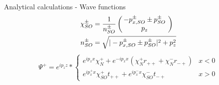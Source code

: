 \documentclass{beamer}
\newcommand{\vect}[2]{\ensuremath{\inp{\hspace{-.8ex}\begin{array}{c}#1\\#2\end{array}\hspace{-.4ex}}}}
\newcommand{\inp}[1]{\ensuremath{\left(#1\right)}}
\begin{document}
\begin{frame}{Analytical calculations - Wave functions}
    \begin{align*}
    \chi_{SO}^{\pm} &= \frac{1}{n_{SO}^{\pm}} 
                        \vect{-p_{x,SO}^{\pm} \pm p_{SO}^\pm}{p_z} \\
        n_{SO}^{\pm}   &= \sqrt{|-p_{x,SO}^{\pm} \pm p_{SO}^\pm|^2 +
            p_z^2}
    \end{align*}
    \pause
    \begin{align*}
        \Psi^+ = e^{i p_z z} * \left\{
            \begin{array}{ll}
                e^{i p_x x} \chi_N^+ + e^{- i p_x x} (\chi_N^+ r_{++} +
                        \chi_N^- r_{-+})    & x < 0\\
                e^{i p_x^+ x} \chi_{SO}^+ t_{++} + e^{i p_x^- x}
                \chi_{SO}^- t_{-+}          & x > 0
            \end{array} \right.
    \end{align*}


\end{frame}
\end{document}
